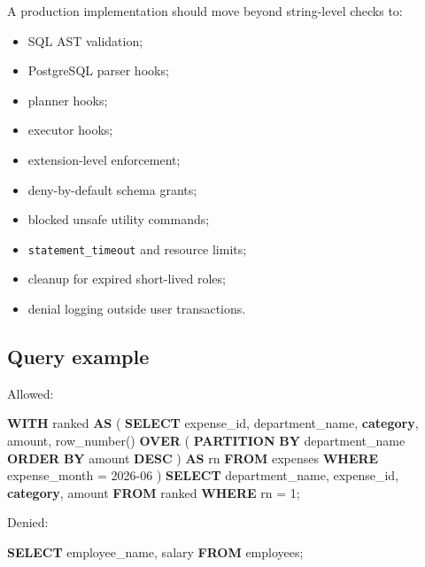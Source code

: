 \documentclass[
]{article}
\newenvironment{Shaded}{}{}
\newcommand{\DecValTok}[1]{\textcolor[rgb]{0.25,0.63,0.44}{#1}}
\newcommand{\FunctionTok}[1]{\textcolor[rgb]{0.02,0.16,0.49}{#1}}
\newcommand{\KeywordTok}[1]{\textcolor[rgb]{0.00,0.44,0.13}{\textbf{#1}}}
\newcommand{\NormalTok}[1]{#1}
\newcommand{\OperatorTok}[1]{\textcolor[rgb]{0.40,0.40,0.40}{#1}}
\newcommand{\StringTok}[1]{\textcolor[rgb]{0.25,0.44,0.63}{#1}}
\providecommand{\tightlist}{%
  \setlength{\itemsep}{0pt}\setlength{\parskip}{0pt}}
\begin{document}
A production implementation should move beyond string-level checks to:

\begin{itemize}
\tightlist
\item
  SQL AST validation;
\item
  PostgreSQL parser hooks;
\item
  planner hooks;
\item
  executor hooks;
\item
  extension-level enforcement;
\item
  deny-by-default schema grants;
\item
  blocked unsafe utility commands;
\item
  \texttt{statement\_timeout} and resource limits;
\item
  cleanup for expired short-lived roles;
\item
  denial logging outside user transactions.
\end{itemize}

\hypertarget{query-example}{%
\subsection{Query example}\label{query-example}}

Allowed:

\begin{Shaded}
\begin{Highlighting}[]
\KeywordTok{WITH}\NormalTok{ ranked }\KeywordTok{AS}\NormalTok{ (}
  \KeywordTok{SELECT}\NormalTok{ expense\_id, department\_name, }\KeywordTok{category}\NormalTok{, amount,}
         \FunctionTok{row\_number}\NormalTok{() }\KeywordTok{OVER}\NormalTok{ (}
           \KeywordTok{PARTITION} \KeywordTok{BY}\NormalTok{ department\_name }\KeywordTok{ORDER} \KeywordTok{BY}\NormalTok{ amount }\KeywordTok{DESC}
\NormalTok{         ) }\KeywordTok{AS}\NormalTok{ rn}
  \KeywordTok{FROM}\NormalTok{ expenses}
  \KeywordTok{WHERE}\NormalTok{ expense\_month }\OperatorTok{=} \StringTok{\textquotesingle{}2026{-}06\textquotesingle{}}
\NormalTok{)}
\KeywordTok{SELECT}\NormalTok{ department\_name, expense\_id, }\KeywordTok{category}\NormalTok{, amount}
\KeywordTok{FROM}\NormalTok{ ranked}
\KeywordTok{WHERE}\NormalTok{ rn }\OperatorTok{=} \DecValTok{1}\NormalTok{;}
\end{Highlighting}
\end{Shaded}

Denied:

\begin{Shaded}
\begin{Highlighting}[]
\KeywordTok{SELECT}\NormalTok{ employee\_name, salary }\KeywordTok{FROM}\NormalTok{ employees;}
\end{Highlighting}
\end{Shaded}
\end{document}
